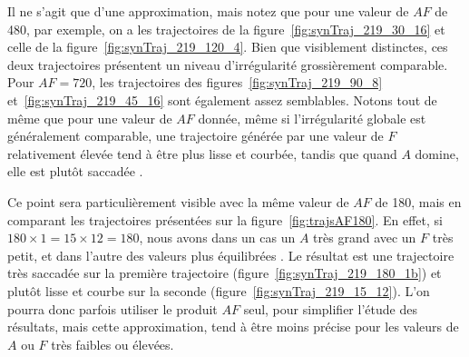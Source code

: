 	Il ne s'agit que d'une approximation, mais notez que pour une valeur de $AF$ de 480, par exemple, on a les trajectoires de la figure~\ref{fig:synTraj_219_30_16} et celle de la figure~\ref{fig:synTraj_219_120_4}. Bien que visiblement distinctes, ces deux trajectoires présentent un niveau d'irrégularité grossièrement comparable. Pour $AF = 720$, les trajectoires des figures~\ref{fig:synTraj_219_90_8} et~\ref{fig:synTraj_219_45_16} sont également assez semblables. Notons tout de même que pour une valeur de $AF$ donnée, même si l'irrégularité globale est généralement comparable, une trajectoire générée par une valeur de $F$ relativement élevée tend à être plus lisse et courbée, tandis que quand $A$ domine, elle est plutôt \og saccadée \fg{}.
	
	Ce point sera particulièrement visible avec la même valeur de $AF$ de 180, mais en comparant les trajectoires présentées sur la figure~\ref{fig:trajsAF180}. En effet, si $180 \times 1 = 15 \times 12 = 180$, nous avons dans un cas un $A$ très grand avec un $F$ très petit, et dans l'autre des valeurs plus \og équilibrées \fg{}. Le résultat est une trajectoire très saccadée sur la première trajectoire (figure~\ref{fig:synTraj_219_180_1b}) et plutôt lisse et courbe sur la seconde (figure~\ref{fig:synTraj_219_15_12}). L'on pourra donc parfois utiliser le produit $AF$ seul, pour simplifier l'étude des résultats, mais cette approximation, tend à être moins précise pour les valeurs de $A$ ou $F$ très faibles ou élevées.
	

